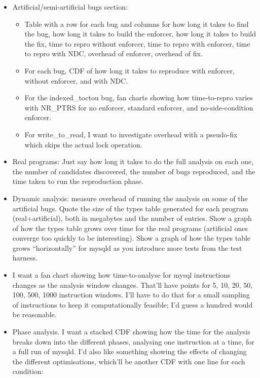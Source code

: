 \begin{itemize}
\item Artificial/semi-artificial bugs section:
  \begin{itemize}
  \item Table with a row for each bug and columns for how
    long it takes to find the bug, how long it takes to build the
    enforcer, how long it takes to build the fix, time to repro without
    enforcer, time to repro with enforcer, time to repro with NDC,
    overhead of enforcer, overhead of fix.
  \item For each bug, CDF of how long it takes to reproduce with
    enforcer, without enforcer, and with NDC.
  \item For the indexed\_toctou bug, fan charts showing how
    time-to-repro varies with NR\_PTRS for no enforcer, standard
    enforcer, and no-side-condition enforcer.
  \item For write\_to\_read, I want to investigate overhead with a
    pseudo-fix which skips the actual lock operation.
  \end{itemize}
\item Real programs: Just say how long it takes to do the full
  analysis on each one, the number of candidates discovered, the
  number of bugs reproduced, and the time taken to run the
  reproduction phase.
\item Dynamic analysis: measure overhead of running the analysis on
  some of the artificial bugs.  Quote the size of the types table
  generated for each program (real+artificial), both in megabytes and
  the number of entries.  Show a graph of how the types table grows
  over time for the real programs (artificial ones converge too
  quickly to be interesting).  Show a graph of how the types table
  grows ``horizontally'' for mysqld as you introduce more tests from
  the test harness.
\item I want a fan chart showing how time-to-analyse for mysql
  instructions changes as the analysis window changes.  That'll have
  points for 5, 10, 20, 50, 100, 500, 1000 instruction windows.  I'll
  have to do that for a small sampling of instructions to keep it
  computationally feasible; I'd guess a hundred would be reasonable.
\item Phase analysis.  I want a stacked CDF showing how the time for
  the analysis breaks down into the different phases, analysing one
  instruction at a time, for a full run of mysqld.  I'd also like
  something showing the effects of changing the different
  optimisations, which'll be another CDF with one line for each
  condition:


\end{itemize}
